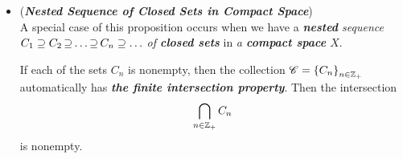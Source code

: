 \documentclass[11pt]{article}
\begin{document}
\begin{itemize}
\item \begin{remark} (\emph{\textbf{Nested Sequence of Closed Sets in Compact Space}})\\
A special case of this proposition occurs when we have a \emph{\textbf{nested} sequence $C_1 \supseteq C_2 \,{\supseteq}\ldots{\supseteq}\, C_n \supseteq  \ldots$ of \textbf{closed sets}} in \emph{a \textbf{compact space} $X$}. 

If each of the sets $C_n$ is nonempty, then the collection ${\mathscr C} = \left\{C_n\right\}_{n \in {\mathbb Z}_{+}}$ automatically has \emph{\textbf{the finite intersection
property}}. Then the intersection
\begin{align*}
\bigcap_{n \in {\mathbb Z}_{+}}C_n
\end{align*}
is nonempty.
\end{remark}
\end{itemize}
\end{document}
